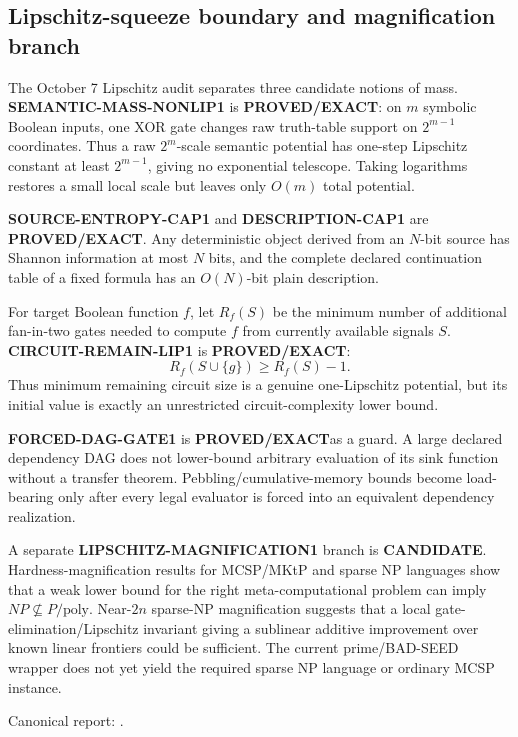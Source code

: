 \documentclass[11pt]{article}
\newcommand{\statusproved}{\textcolor{proved}{\textbf{PROVED/EXACT}}}
\newcommand{\statuscandidate}{\textcolor{candidate}{\textbf{CANDIDATE}}}
\theoremstyle{plain}
\theoremstyle{definition}
\theoremstyle{remark}
\begin{document}
\subsection{Lipschitz-squeeze boundary and magnification branch}

The October 7 Lipschitz audit separates three candidate notions of
mass. \textbf{SEMANTIC-MASS-NONLIP1} is \statusproved: on \(m\)
symbolic Boolean inputs, one XOR gate changes raw truth-table support on
\(2^{m-1}\) coordinates. Thus a raw \(2^m\)-scale semantic potential has
one-step Lipschitz constant at least \(2^{m-1}\), giving no exponential
telescope. Taking logarithms restores a small local scale but leaves only
\(O(m)\) total potential.

\textbf{SOURCE-ENTROPY-CAP1} and \textbf{DESCRIPTION-CAP1} are
\statusproved. Any deterministic object derived from an \(N\)-bit source
has Shannon information at most \(N\) bits, and the complete declared
continuation table of a fixed formula has an \(O(N)\)-bit plain description.

For target Boolean function \(f\), let \(R_f(S)\) be the minimum number of
additional fan-in-two gates needed to compute \(f\) from currently available
signals \(S\). \textbf{CIRCUIT-REMAIN-LIP1} is \statusproved:
\[
R_f(S\cup\{g\})\ge R_f(S)-1.
\]
Thus minimum remaining circuit size is a genuine one-Lipschitz potential,
but its initial value is exactly an unrestricted circuit-complexity lower
bound.

\textbf{FORCED-DAG-GATE1} is \statusproved as a guard. A large declared
dependency DAG does not lower-bound arbitrary evaluation of its sink function
without a transfer theorem. Pebbling/cumulative-memory bounds become
load-bearing only after every legal evaluator is forced into an equivalent
dependency realization.

A separate \textbf{LIPSCHITZ-MAGNIFICATION1} branch is \statuscandidate.
Hardness-magnification results for MCSP/MKtP and sparse NP languages show that
a weak lower bound for the right meta-computational problem can imply
\(NP\not\subseteq P/\mathrm{poly}\). Near-\(2n\) sparse-NP magnification
suggests that a local gate-elimination/Lipschitz invariant giving a sublinear
additive improvement over known linear frontiers could be sufficient. The
current prime/BAD-SEED wrapper does not yet yield the required sparse NP
language or ordinary MCSP instance.

Canonical report:
.
\end{document}
